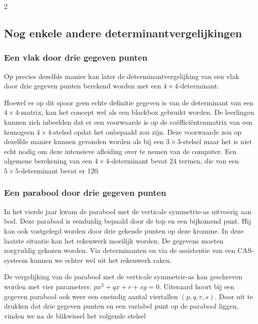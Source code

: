 \begin{multicols}{2}

\subsection{Nog enkele andere determinantvergelijkingen}

\subsubsection*{Een vlak door drie gegeven punten}
Op precies dezelfde manier kan later de determinantvergelijking van een vlak door drie gegeven punten berekend worden met een $4 \times 4$-determinant. 

Hoewel er op dit spoor geen echte definitie gegeven is van de determinant van een $4 \times 4$-matrix, kan het concept wel als een blackbox gebruikt worden. De leerlingen kunnen zich inbeelden dat er een voorwaarde is op de coëfficiëntenmatrix van een homogeen $4 \times 4$-stelsel opdat het onbepaald zou zijn. Deze voorwaarde zou op dezelfde manier kunnen gevonden worden als bij een $3 \times 3$-stelsel maar het is niet echt nodig om deze intensieve afleiding over te nemen van de computer. Een algemene berekening van een $4\times 4$-determinant bevat 24 termen, die van een $5\times 5$-determinant bevat er 120.
\subsubsection*{Een parabool door drie gegeven punten}
In het vierde jaar kwam de parabool met de verticale symmetrie-as uitvoerig aan bod. Deze parabool is eenduidig bepaald door de top en een bijkomend punt. Hij kan ook vastgelegd worden door drie gekende punten op deze kromme. In deze laatste situatie kan het rekenwerk moeilijk worden. De gegevens moeten zorgvuldig gekozen worden. Via determinanten en via de assistentie van een CAS-systeem kunnen we echter wel uit het rekenwerk raken.

De vergelijking van de parabool met de verticale symmetrie-as kan geschreven worden met vier parameters: $px^2+qx+r+sy=0$. Uiteraard hoort bij een gegeven parabool ook weer een oneindig aantal viertallen $(p,q,r,s)$. Door uit te drukken dat drie gegeven punten en een variabel punt op de parabool liggen, vinden we na de blikwissel het volgende stelsel


\end{multicols}
